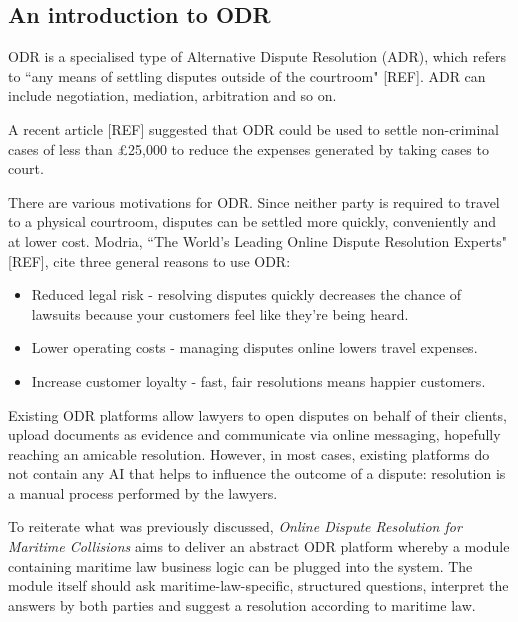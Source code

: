 \subsection{An introduction to ODR}

ODR is a specialised type of Alternative Dispute Resolution (ADR), which refers to ``any means of settling disputes outside of the courtroom" [REF]. ADR can include negotiation, mediation, arbitration and so on. %

A recent article [REF] suggested that ODR could be used to settle non-criminal cases of less than £25,000 to reduce the expenses generated by taking cases to court. %

There are various motivations for ODR. Since neither party is required to travel to a physical courtroom, disputes can be settled more quickly, conveniently and at lower cost. Modria, ``The World's Leading Online Dispute Resolution Experts" [REF], cite three general reasons to use ODR: %

\begin{itemize}
    \item Reduced legal risk - resolving disputes quickly decreases the chance of lawsuits because your customers feel like they're being heard.
    \item Lower operating costs - managing disputes online lowers travel expenses.
    \item Increase customer loyalty - fast, fair resolutions means happier customers.
\end{itemize}

Existing ODR platforms allow lawyers to open disputes on behalf of their clients, upload documents as evidence and communicate via online messaging, hopefully reaching an amicable resolution. However, in most cases, existing platforms do not contain any AI that helps to influence the outcome of a dispute: resolution is a manual process performed by the lawyers.

To reiterate what was previously discussed, \emph{Online Dispute Resolution for Maritime Collisions} aims to deliver an abstract ODR platform whereby a module containing maritime law business logic can be plugged into the system. The module itself should ask maritime-law-specific, structured questions, interpret the answers by both parties and suggest a resolution according to maritime law.

